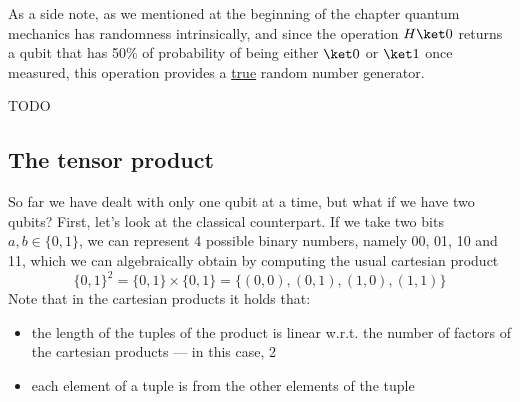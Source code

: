 \documentclass[a4paper, 12pt]{report}
\begin{document}
As a side note, as we mentioned at the beginning of the chapter quantum mechanics has randomness intrinsically, and since the operation $H \ket 0$ returns a qubit that has 50\% of probability of being either $\ket 0$ or $\ket 1$ once measured, this operation provides a \underline{true} random number generator. 

TODO 

\subsection{The tensor product}

So far we have dealt with only one qubit at a time, but what if we have two qubits? First, let's look at the classical counterpart. If we take two bits $a, b \in \{0, 1\}$, we can represent 4 possible binary numbers, namely 00, 01, 10 and 11, which we can algebraically obtain by computing the usual cartesian product $$\{0, 1\}^2 = \{0, 1\} \times \{0, 1\} = \{(0, 0), (0, 1), (1, 0), (1, 1)\}$$ Note that in the cartesian products it holds that:

\begin{itemize}
	\item the length of the tuples of the product is linear w.r.t. the number of factors of the cartesian products --- in this case, 2
	\item each element of a tuple is  from the other elements of the tuple
\end{itemize}
\end{document}
